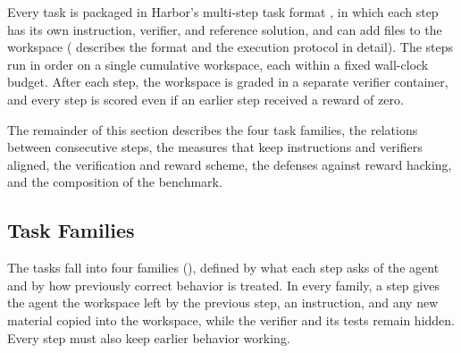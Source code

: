 \documentclass{article}
\begin{document}
Every task is packaged in Harbor's multi-step task format \citep{harbor2026},
in which each step has its own instruction, verifier, and reference solution,
and can add files to the workspace ( describes the format and the execution
protocol in detail). The steps run in order on a single cumulative workspace, each within a fixed wall-clock budget. After each step, the workspace is graded in a separate verifier
container, and every step is scored even if an earlier step received a reward
of zero.

The remainder of this section describes the four task families, the relations
between consecutive steps, the measures that keep instructions and verifiers
aligned, the verification and reward scheme, the defenses against reward
hacking, and the composition of the benchmark.

\subsection{Task Families}
\label{sec:families}

The tasks fall into four families (), defined by what each
step asks of the agent and by how previously correct behavior is treated. In
every family, a step gives the agent the workspace left by the previous step,
an instruction, and any new material copied into the workspace, while the
verifier and its tests remain hidden. Every step must also keep earlier
behavior working.
\end{document}
